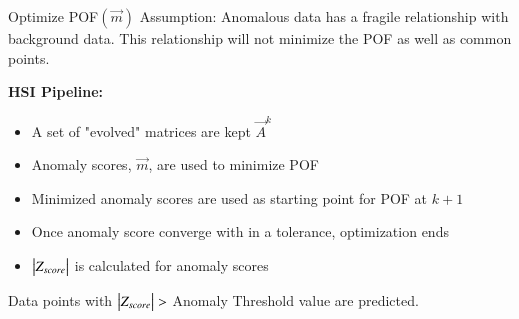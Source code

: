 \begin{frame}{Optimize POF$(\vec{m})$}
    Assumption: Anomalous data has a fragile relationship with background data. This relationship will not minimize the POF as well as common points. \vfill

    \textbf{HSI Pipeline:}
    \begin{itemize}
        \item A set of "evolved" matrices are kept $\vec{A}^k$
        \item Anomaly scores, $\vec{m}$, are used to minimize POF 
        \item Minimized anomaly scores are used as starting point for POF at $k+1$
        \item Once anomaly score converge with in a tolerance, optimization ends
        \item ${\big |} Z_{score}{\big |}$ is calculated for anomaly scores
    \end{itemize}\vfill
    Data points with ${\big |} Z_{score}{\big |}>$ Anomaly Threshold value are predicted. 
\end{frame}


    